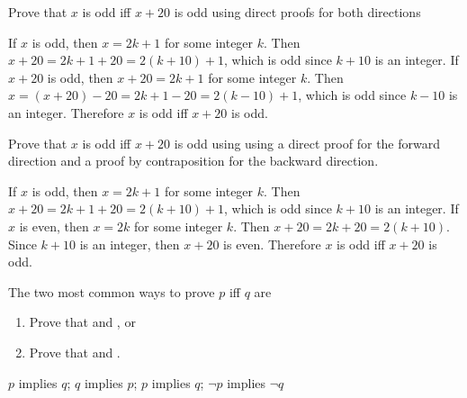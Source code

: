 \begin{exer}
Prove that $x$ is odd iff $x+20$ is odd using direct proofs for both directions

\vspace*{2.5in}
\begin{answer}
If $x$ is odd, then $x=2k+1$ for some integer $k$.  
Then $x+20=2k+1+20=2(k+10)+1$, which is odd since $k+10$ is an integer.
If $x+20$ is odd, then $x+20=2k+1$ for some integer $k$.  Then $x=(x+20)-20=2k+1-20=2(k-10)+1$,
which is odd since $k-10$ is an integer.
Therefore $x$ is odd iff $x+20$ is odd.
\end{answer}
\end{exer}

\begin{exer}
Prove that $x$ is odd iff $x+20$ is odd using 
using a direct proof for the forward direction and a proof by contraposition for the backward direction.

\vspace*{2.5in}
\begin{answer}
If $x$ is odd, then $x=2k+1$ for some integer $k$.  
Then $x+20=2k+1+20=2(k+10)+1$, which is odd since $k+10$ is an integer.
If $x$ is even, then $x=2k$ for some integer $k$. 
Then $x+20=2k+20=2(k+10)$.  Since $k+10$ is an integer, then 
$x+20$ is even. Therefore $x$ is odd iff $x+20$ is odd. 
\end{answer}
\end{exer}


\begin{fib}
The two most common ways to prove $p$ iff $q$ are
\begin{enumerate}
\item
Prove that  and , or
\item
Prove that  and .
\end{enumerate}
\begin{answer} 
$p$ implies $q$; 
$q$ implies $p$;  
$p$ implies $q$; 
$\neg p$ implies $\neg q$
\end{answer}
\end{fib}

